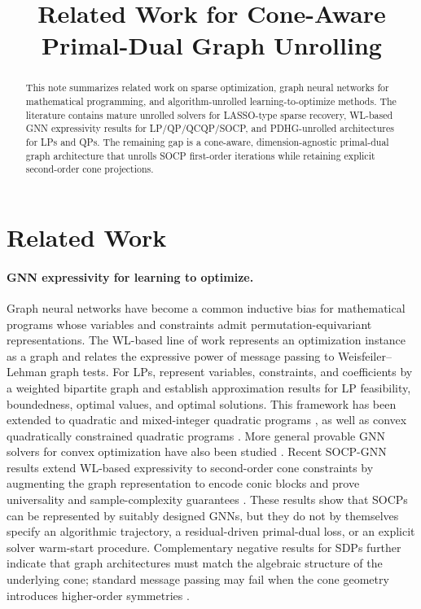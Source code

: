 \documentclass[10pt,twocolumn]{article}
\title{Related Work for Cone-Aware Primal-Dual Graph Unrolling}
\author{}
\date{}
\begin{document}
\maketitle

\begin{abstract}
This note summarizes related work on sparse optimization, graph neural networks for mathematical programming, and algorithm-unrolled learning-to-optimize methods.
The literature contains mature unrolled solvers for LASSO-type sparse recovery, WL-based GNN expressivity results for LP/QP/QCQP/SOCP, and PDHG-unrolled architectures for LPs and QPs.
The remaining gap is a cone-aware, dimension-agnostic primal-dual graph architecture that unrolls SOCP first-order iterations while retaining explicit second-order cone projections.
\end{abstract}

\section{Related Work}

\paragraph{GNN expressivity for learning to optimize.}
Graph neural networks have become a common inductive bias for mathematical programs whose variables and constraints admit permutation-equivariant representations.
The WL-based line of work represents an optimization instance as a graph and relates the expressive power of message passing to Weisfeiler--Lehman graph tests.
For LPs, \citet{chen2022lpgnn} represent variables, constraints, and coefficients by a weighted bipartite graph and establish approximation results for LP feasibility, boundedness, optimal values, and optimal solutions.
This framework has been extended to quadratic and mixed-integer quadratic programs \citep{chen2024qpgnn}, as well as convex quadratically constrained quadratic programs \citep{wu2024qcqpgnn}.
More general provable GNN solvers for convex optimization have also been studied \citep{qian2025provableconvexgnn}.
Recent SOCP-GNN results extend WL-based expressivity to second-order cone constraints by augmenting the graph representation to encode conic blocks and prove universality and sample-complexity guarantees \citep{li2025socpgnnworkshop,li2026socpgnn}.
These results show that SOCPs can be represented by suitably designed GNNs, but they do not by themselves specify an algorithmic trajectory, a residual-driven primal-dual loss, or an explicit solver warm-start procedure.
Complementary negative results for SDPs further indicate that graph architectures must match the algebraic structure of the underlying cone; standard message passing may fail when the cone geometry introduces higher-order symmetries \citep{qian2026sdpgnn}.
\end{document}
